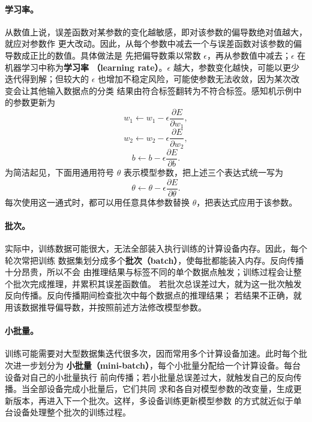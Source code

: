 \paragraph{学习率。}
从数值上说，误差函数对某参数的变化越敏感，即对该参数的偏导数绝对值越大，就应对参数作
更大改动。因此，从每个参数中减去一个与误差函数对该参数的偏导数成正比的数值。具体做法是
先把偏导数乘以常数 $\epsilon$，再从参数值中减去；$\epsilon$ 在机器学习中称为\textbf{学习率
（learning rate）}。$\epsilon$ 越大，参数变化越快，可能以更少迭代得到解；但较大的
$\epsilon$ 也增加不稳定风险，可能使参数无法收敛，因为某次改变会让其他输入数据点的分类
结果由符合标签翻转为不符合标签。感知机示例中的参数更新为
\begin{equation}
  w_1\leftarrow w_1-\epsilon\frac{\partial E}{\partial w_1},
  \label{eq:appb-14}
\end{equation}
\begin{equation}
  w_2\leftarrow w_2-\epsilon\frac{\partial E}{\partial w_2},
  \label{eq:appb-15}
\end{equation}
\begin{equation}
  b\leftarrow b-\epsilon\frac{\partial E}{\partial b}.
  \label{eq:appb-16}
\end{equation}
为简洁起见，下面用通用符号 $\theta$ 表示模型参数，把上述三个表达式统一写为
\begin{equation}
  \theta\leftarrow\theta-\epsilon\frac{\partial E}{\partial\theta}.
  \label{eq:appb-17}
\end{equation}
每次使用这一通式时，都可以用任意具体参数替换 $\theta$，把表达式应用于该参数。

\paragraph{批次。}
实际中，训练数据可能很大，无法全部装入执行训练的计算设备内存。因此，每个轮次常把训练
数据集划分成多个\textbf{批次（batch）}，使每批都能装入内存。反向传播十分昂贵，所以不会
由推理结果与标签不同的单个数据点触发；训练过程会让整个批次完成推理，并累积其误差函数值。
若批次总误差过大，就为这一批次触发反向传播。反向传播期间检查批次中每个数据点的推理结果；
若结果不正确，就用该数据推导偏导数，并按照前述方法修改模型参数。

\paragraph{小批量。}
训练可能需要对大型数据集迭代很多次，因而常用多个计算设备加速。此时每个批次进一步划分为
\textbf{小批量（mini-batch）}，每个小批量分配给一个计算设备。每台设备对自己的小批量执行
前向传播；若小批量总误差过大，就触发自己的反向传播。当全部设备完成小批量后，它们共同
求和各自对模型参数的改变量，生成更新版本，再进入下一个批次。这样，多设备训练更新模型参数
的方式就近似于单台设备处理整个批次的训练过程。

